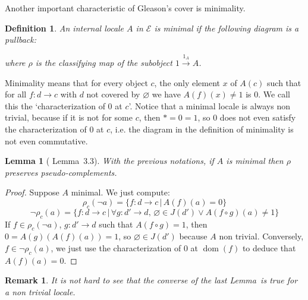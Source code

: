 \documentclass{article}
\newtheorem{Lemma}[theorem]{Lemma}
\newtheorem{definition}[theorem]{Definition}
\newtheorem{remark}[theorem]{Remark}
\newcommand{\dom}{{\operatorname{dom}}}
\begin{document}
Another important characteristic of Gleason's cover is minimality.

\begin{definition}
    An internal locale $A$ in $\mathcal{E}$ is minimal if the following diagram is a pullback:
    \begin{center}
\end{center}
where $\rho$ is the classifying map of the subobject $1\xrightarrow{1_A}A$.
\end{definition}
Minimality means that for every object $c$, the only element $x$ of $A(c)$ such that for all $f:d\xrightarrow{}c$ with $d$ not covered by $\varnothing$ we have $A(f)(x)\ne 1$ is 0. We call this the `characterization of 0 at $c$'. Notice that a minimal locale is always non trivial, because if it is not for some $c$, then $*=0=1$, so 0 does not even satisfy the characterization of 0 at $c$, i.e. the diagram in the definition of minimality is not even commutative.

\begin{Lemma}[\cite{harun1996applications} Lemma~3.3]
    With the previous notations, if $A$ is minimal then $\rho$ preserves pseudo-complements.
\end{Lemma}
\begin{proof}
    Suppose $A$ minimal. We just compute:
    $$\rho_c(\neg a)=\{f:d\xrightarrow{}c\,|\,A(f)(a)=0\}$$
    $$\neg\rho_c(a)=\{f:d\xrightarrow{}c\,|\,\forall g:d'\xrightarrow{}d,\,\varnothing\in J(d')\lor A(f\circ g)(a)\ne 1\}$$
    If $f\in \rho_c(\neg a)$, $g:d'\xrightarrow{}d$ such that $A(f\circ g)=1$, then $0=A(g)(A(f)(a))=1$, so  $\varnothing\in J(d')$ because $A$ non trivial. Conversely, $f\in \neg\rho_c(a)$, we just use the characterization of 0 at $\dom(f)$ to deduce that $A(f)(a)=0$.
\end{proof}

\begin{remark}
    It is not hard to see that the converse of the last Lemma~is true for a non trivial locale.
\end{remark}
\end{document}
